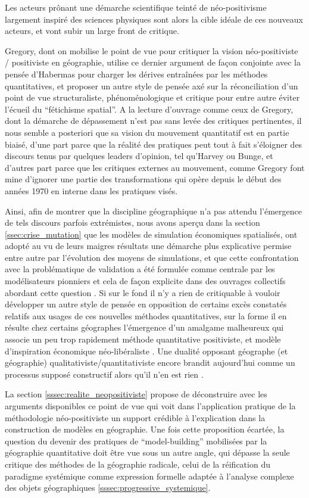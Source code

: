 Les acteurs prônant une démarche scientifique teinté de néo-positivisme largement inspiré des sciences physiques sont alors la cible idéale de ces nouveaux acteurs, et vont subir un large front de critique.

Gregory, dont on mobilise le point de vue pour critiquer la vision néo-positiviste / positiviste en géographie, utilise ce dernier argument de façon conjointe avec la pensée d'Habermas pour charger les dérives entraînées par les méthodes quantitatives, et proposer un autre style de pensée axé sur la réconciliation d'un point de vue structuraliste, phénoménologique et critique pour entre autre éviter l'écueil du \enquote{fétichisme spatial}. A la lecture d'ouvrage comme ceux de Gregory, dont la démarche de dépassement n'est pas sans levée des critiques pertinentes, il nous semble a posteriori que sa vision du mouvement quantitatif est en partie biaisé, d'une part parce que la réalité des pratiques peut tout à fait s'éloigner des discours tenus par quelques leaders d'opinion, tel qu'Harvey ou Bunge, et d'autres part parce que les critiques externes au mouvement, comme Gregory font mine d'ignorer une partie des transformations qui opère depuis le début des années 1970 en interne dans les pratiques visés.

Ainsi, afin de montrer que la discipline géographique n'a pas attendu l'émergence de tels discours parfois extrémistes, nous avons aperçu dans la section \ref{ssec:crise_mutation} que les modèles de simulation économiques spatialisés, ont adopté au vu de leurs maigres résultats une démarche plus explicative permise entre autre par l'évolution des moyens de simulations, et que cette confrontation avec la problématique de validation a été formulée comme centrale par les modélisateurs pionniers et cela de façon explicite dans des ouvrages collectifs abordant cette question \autocite{Marble1972}. Si sur le fond il n'y a rien de critiquable à vouloir développer un autre style de pensée en opposition de certains excès constatés relatifs aux usages de ces nouvelles méthodes quantitatives, sur la forme il en résulte chez certains géographes l'émergence d'un amalgame malheureux qui associe un peu trop rapidement méthode quantitative positiviste, et modèle d'inspiration économique néo-libéraliste \autocite[61-64]{Paterson1984}. Une dualité opposant géographe (et géographie) qualitativiste/quantitativiste encore brandit aujourd'hui comme un processus supposé constructif alors qu'il n'en est rien \autocite{Sheppard2001}.

La section \ref{sssec:realite_neopositiviste} propose de déconstruire avec les arguments disponibles ce point de vue qui voit dans l'application pratique de la méthodologie néo-positiviste un support crédible à l'explication dans la construction de modèles en géographie. Une fois cette proposition écartée, la question du devenir des pratiques de \foreignquote{english}{model-building} mobilisées par la géographie quantitative doit être vue sous un autre angle, qui dépasse la seule critique des méthodes de la géographie radicale, celui de la réification du paradigme systémique comme expression formelle adaptée à l'analyse complexe des objets géographiques \ref{sssec:progressive_systemique}.

